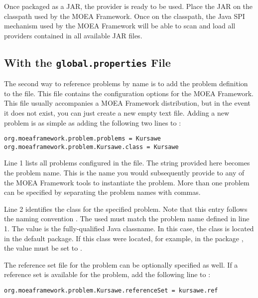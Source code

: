 Once packaged as a JAR, the provider is ready to be used.  Place the JAR on the classpath used by the MOEA Framework.  Once on the classpath, the Java SPI mechanism used by the MOEA Framework will be able to scan and load all providers contained in all available JAR files.

\subsection{With the \texttt{global.properties} File}
The second way to reference problems by name is to add the problem definition to the  file.  This  file contains the configuration options for the MOEA Framework.  This file usually accompanies a MOEA Framework distribution, but in the event it does not exist, you can just create a new empty text file.  Adding a new problem is as simple as adding the following two lines to :

\begin{lstlisting}[language=Plaintext]
org.moeaframework.problem.problems = Kursawe
org.moeaframework.problem.Kursawe.class = Kursawe
\end{lstlisting}

Line 1 lists all problems configured in the  file.  The string provided here becomes the problem name.  This is the name you would subsequently provide to any of the MOEA Framework tools to instantiate the problem.  More than one problem can be specified by separating the problem names with commas.

Line 2 identifies the class for the specified problem.  Note that this entry follows the naming convention .  The  used must match the problem name defined in line 1.  The value is the fully-qualified Java classname.  In this case, the class is located in the default package.  If this class were located, for example, in the package , the value must be set to .

The reference set file for the problem can be optionally specified as well.  If a reference set is available for the problem, add the following line to :

\begin{lstlisting}[language=Plaintext]
org.moeaframework.problem.Kursawe.referenceSet = kursawe.ref
\end{lstlisting}

